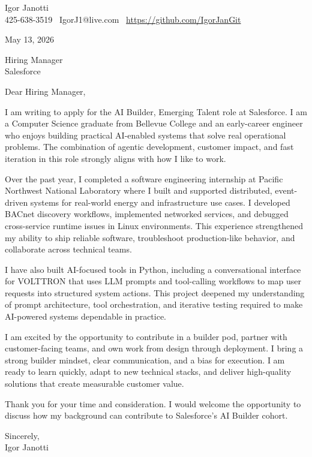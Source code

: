 \documentclass[11pt]{article}
\begin{document}
Igor Janotti\\
425-638-3519 \textbar\ IgorJ1@live.com \textbar\ \url{https://github.com/IgorJanGit}

May 13, 2026

Hiring Manager\\
Salesforce

Dear Hiring Manager,

I am writing to apply for the AI Builder, Emerging Talent role at Salesforce. I am a Computer Science graduate from Bellevue College and an early-career engineer who enjoys building practical AI-enabled systems that solve real operational problems. The combination of agentic development, customer impact, and fast iteration in this role strongly aligns with how I like to work.

Over the past year, I completed a software engineering internship at Pacific Northwest National Laboratory where I built and supported distributed, event-driven systems for real-world energy and infrastructure use cases. I developed BACnet discovery workflows, implemented networked services, and debugged cross-service runtime issues in Linux environments. This experience strengthened my ability to ship reliable software, troubleshoot production-like behavior, and collaborate across technical teams.

I have also built AI-focused tools in Python, including a conversational interface for VOLTTRON that uses LLM prompts and tool-calling workflows to map user requests into structured system actions. This project deepened my understanding of prompt architecture, tool orchestration, and iterative testing required to make AI-powered systems dependable in practice.

I am excited by the opportunity to contribute in a builder pod, partner with customer-facing teams, and own work from design through deployment. I bring a strong builder mindset, clear communication, and a bias for execution. I am ready to learn quickly, adapt to new technical stacks, and deliver high-quality solutions that create measurable customer value.

Thank you for your time and consideration. I would welcome the opportunity to discuss how my background can contribute to Salesforce's AI Builder cohort.

Sincerely,\\
Igor Janotti
\end{document}
